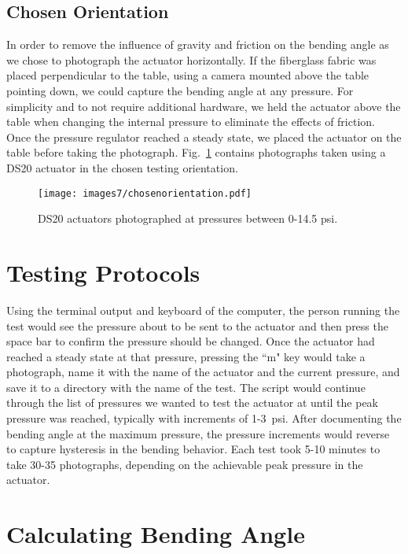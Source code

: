 \clearpage
\subsection{Chosen Orientation}

In order to remove the influence of gravity and friction on the bending angle as we chose to photograph the actuator horizontally. If the fiberglass fabric was placed perpendicular to the table, using a camera mounted above the table pointing down, we could capture the bending angle at any pressure. For simplicity and to not require additional hardware, we held the actuator above the table when changing the internal pressure to eliminate the effects of friction. Once the pressure regulator reached a steady state, we placed the actuator on the table before taking the photograph. Fig.~\ref{fig:chosenorientation} contains photographs taken using a DS20 actuator in the chosen testing orientation. \\

\begin{figure}[!ht]
    \centering
    \texttt{[image: images7/chosenorientation.pdf]}
    \caption{DS20 actuators photographed at pressures between 0-14.5 psi.}
    \label{fig:chosenorientation}
\end{figure}

\clearpage
\section{Testing Protocols}

Using the terminal output and keyboard of the computer, the person running the test would see the pressure about to be sent to the actuator and then press the space bar to confirm the pressure should be changed. Once the actuator had reached a steady state at that pressure, pressing the ``m" key would take a photograph, name it with the name of the actuator and the current pressure, and save it to a directory with the name of the test. The script would continue through the list of pressures we wanted to test the actuator at until the peak pressure was reached, typically with increments of 1-3~psi. After documenting the bending angle at the maximum pressure, the pressure increments would reverse to capture hysteresis in the bending behavior. Each test took 5-10 minutes to take 30-35 photographs, depending on the achievable peak pressure in the actuator.

\section{Calculating Bending Angle}

